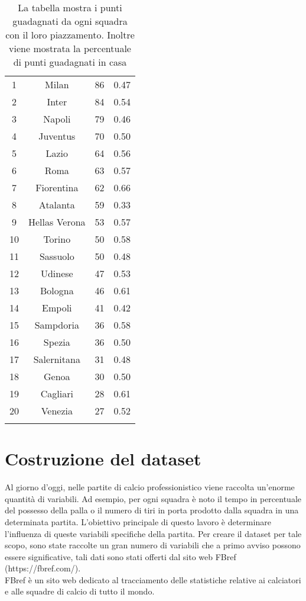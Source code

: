 	\begin{table}[!h]%
	\renewcommand{\arraystretch}{1.7}
	\centering
	\begin{tabular}{c c c c}
		\hline	
		\rowcolor{SchoolColor}
		\intest{Posizione} & \intest{Squadra} & \intest{Punti} & \intest{ \% casa}  \\	
		\hline			
		1 & Milan & 86 & 0.47\\
		2 & Inter & 84 & 0.54\\
		3 & Napoli & 79 & 0.46\\
		4 & Juventus & 70 & 0.50\\
		5 & Lazio & 64 & 0.56\\
		6 & Roma & 63 & 0.57\\
		7 & Fiorentina & 62 & 0.66\\
		8 & Atalanta & 59 & 0.33\\
		9 & Hellas Verona & 53 & 0.57\\
		10 & Torino & 50 & 0.58\\
		11 & Sassuolo & 50 & 0.48\\
		12 & Udinese & 47 & 0.53\\
		13 & Bologna & 46 & 0.61\\
		14 & Empoli & 41 & 0.42\\
		15 & Sampdoria & 36 & 0.58\\
		16 & Spezia & 36 & 0.50\\
		17 & Salernitana & 31 & 0.48\\
		18 & Genoa & 30 & 0.50\\
		19 & Cagliari & 28 & 0.61\\
		20 & Venezia & 27 & 0.52\\
			\hline
		 & & & \\
	
	\end{tabular} \hbox{}

	\caption{La tabella mostra i punti guadagnati da ogni squadra con il loro piazzamento. Inoltre viene mostrata la percentuale di punti guadagnati in casa} \label{tab:ranking}
\end{table}

\section{Costruzione del dataset}

Al giorno d'oggi, nelle partite di calcio professionistico viene raccolta un'enorme quantità di variabili. Ad esempio, per ogni squadra è noto il tempo in percentuale del possesso della palla o il numero di tiri in porta prodotto dalla squadra in una determinata partita. L'obiettivo principale di questo lavoro è determinare l'influenza di queste variabili specifiche della partita. Per creare il dataset per tale scopo, sono state raccolte un gran numero di variabili che a primo avviso possono essere significative, tali dati sono stati offerti dal sito web FBref (https://fbref.com/).\\ FBref è un sito web dedicato al tracciamento delle statistiche relative ai calciatori e alle squadre di calcio di tutto il mondo. \\

